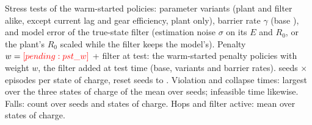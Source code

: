 \documentclass[12pt,a4paper]{article}
\begin{document}
\begin{table}[p]\centering\caption{Stress tests of the warm-started policies: parameter variants (plant and filter alike, except current lag and gear efficiency, plant only), barrier rate $\gamma$ (base ), and model error of the true-state filter (estimation noise $\sigma$ on its $E$ and $R_0$, or the plant's $R_0$ scaled while the filter keeps the model's). Penalty $w=\res{pst_w}$ + filter at test: the warm-started penalty policies with weight $w$, the filter added at test time (base, variants and barrier rates).  seeds $\times$  episodes per state of charge, reset seeds  to . Violation and collapse times: largest over the three states of charge of the mean over seeds; infeasible time likewise. Falls: count over seeds and states of charge. Hops and filter active: mean over states of charge.}\label{tab:ablfull}
\end{table}
\end{document}
